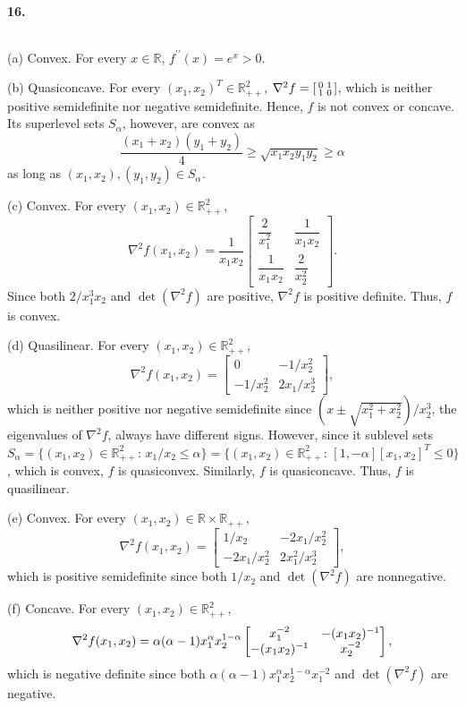   \paragraph{16.}
  \begin{solution}
    $\,$\par
    (a) Convex. For every $x\in\mathbb{R}$, $f^{\prime\prime}(x)=e^x>0$.\par
    (b) Quasiconcave. For every $(x_1,x_2)^T\in\mathbb{R}_{++}^2$, $\nabla^2f=
    \begin{bsmallmatrix} 0 & 1 \\ 1 & 0\end{bsmallmatrix}$, which is neither
    positive semidefinite nor negative semidefinite. Hence, $f$ is not convex or
    concave. Its superlevel sets $S_\alpha$, however, are convex as
    \[
      \frac{(x_1+x_2)(y_1+y_2)}{4} \ge \sqrt{x_1x_2y_1y_2} \ge \alpha
    \]
    as long as $(x_1,x_2),(y_1,y_2)\in S_\alpha$.\par
    (c) Convex. For every $(x_1,x_2)\in \mathbb{R}_{++}^2$, 
    \[
      \nabla^2f(x_1,x_2) = \frac{1}{x_1x_2}
      \begin{bmatrix}
        \dfrac{2}{x_1^2} & \dfrac{1}{x_1x_2} \\
        \dfrac{1}{x_1x_2} & \dfrac{2}{x_2^2}
      \end{bmatrix}.
    \]
    Since both $2/x_1^3x_2$ and $\det(\nabla^2 f)$ are positive, $\nabla^2 f$ is
    positive definite. Thus, $f$ is convex.\par
    (d) Quasilinear. For every $(x_1, x_2)\in\mathbb{R}_{++}^2$,
    \[
      \nabla^2f(x_1,x_2) = \begin{bmatrix}
        0 & -1/x_2^2 \\ -1/x_2^2 & 2x_1/x_2^3
      \end{bmatrix},
    \]
    which is neither positive nor negative semidefinite since $(x\pm\sqrt{x_1^2+
    x_2^2})/x_2^3$, the eigenvalues of $\nabla^2f$, always have different signs.
    However, since it sublevel sets $S_\alpha=\{(x_1,x_2)\in\mathbb{R}_{++}^2:\,
    x_1/x_2\le\alpha\}=\{(x_1,x_2)\in\mathbb{R}_{++}^2:\,[1,-\alpha][x_1,x_2]^T
    \le 0\}$, which is convex, $f$ is quasiconvex. Similarly, $f$ is 
    quasiconcave. Thus, $f$ is quasilinear.\par
    (e) Convex. For every $(x_1,x_2)\in\mathbb{R}\times\mathbb{R}_{++}$,
    \[
      \nabla^2f(x_1,x_2) = \begin{bmatrix}
        1/x_2 & -2x_1/x_2^2 \\ -2x_1/x_2^2 & 2x_1^2/x_2^3
      \end{bmatrix},
    \]
    which is positive semidefinite since both $1/x_2$ and $\det(\nabla^2 f)$ are
    nonnegative. \par
    (f) Concave. For every $(x_1,x_2)\in\mathbb{R}_{++}^2$,
    \[
      \nabla^2f(x_1,x_2) = \alpha(\alpha-1)x_1^\alpha x_2^{1-\alpha}
      \begin{bmatrix}
        x_1^{-2} & -(x_1x_2)^{-1} \\ -(x_1x_2)^{-1} & x_2^{-2}
      \end{bmatrix},
    \]
    which is negative definite since both $\alpha(\alpha-1)x_1^\alpha
    x_2^{1-\alpha}x_1^{-2}$ and $\det(\nabla^2 f)$ are negative.
  \end{solution}
